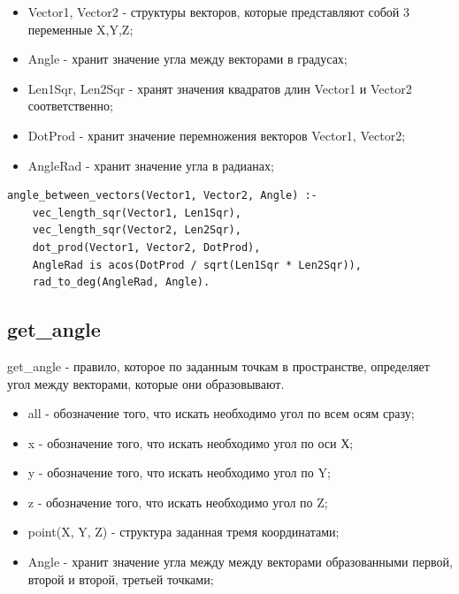 \begin{itemize}
	\item Vector1, Vector2 - структуры векторов, которые представляют собой 3 переменные X,Y,Z;
	\item Angle - хранит значение угла между векторами в градусах;
	\item Len1Sqr, Len2Sqr - хранят значения квадратов длин Vector1 и Vector2 соответственно;
	\item DotProd - хранит значение перемножения векторов Vector1, Vector2;
	\item AngleRad - хранит значение угла в радианах;
\end{itemize}

\begin{lstlisting}[caption=Реализация правила angle\_between\_vectors, label=rules:anglebetweenvectors]
angle_between_vectors(Vector1, Vector2, Angle) :-
	vec_length_sqr(Vector1, Len1Sqr),
	vec_length_sqr(Vector2, Len2Sqr),
	dot_prod(Vector1, Vector2, DotProd),
	AngleRad is acos(DotProd / sqrt(Len1Sqr * Len2Sqr)),
	rad_to_deg(AngleRad, Angle).
\end{lstlisting}

\subsection{get\_angle}
\hspace{0.6cm} get\_angle - правило, которое по заданным точкам в пространстве, определяет угол между векторами, которые они образовывают.

\begin{itemize}
	\item all - обозначение того, что искать необходимо угол по всем осям сразу;
	\item x - обозначение того, что искать необходимо угол по оси Х;
	\item y - обозначение того, что искать необходимо угол по Y;
	\item z - обозначение того, что искать необходимо угол по Z;
	\item point(X, Y, Z) - структура заданная тремя координатами;
	\item Angle - хранит значение угла между между векторами образованными первой, второй и второй, третьей точками;
\end{itemize}

